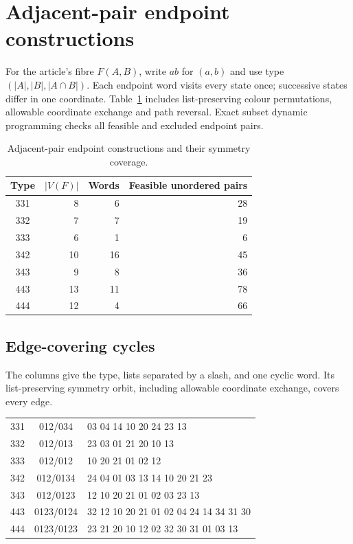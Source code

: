 \section{Adjacent-pair endpoint constructions}
\label{app:pair-five-constructions}
For the article's fibre $F(A,B)$, write $ab$ for $(a,b)$ and use type
$(|A|,|B|,|A\cap B|)$. Each endpoint word visits every state once;
successive states differ in one coordinate. Table~\ref{tab:pair-five-counts}
includes list-preserving colour permutations, allowable coordinate
exchange and path reversal. Exact subset dynamic programming checks
all feasible and excluded endpoint pairs.

\begin{table}[htbp]
\centering
\caption{Adjacent-pair endpoint constructions and their symmetry coverage.}
\label{tab:pair-five-counts}
\begin{tabular}{crrr}
\toprule
Type & $|V(F)|$ & Words & Feasible unordered pairs\\
\midrule
 331&8&6&28\\
 332&7&7&19\\
 333&6&1&6\\
 342&10&16&45\\
 343&9&8&36\\
 443&13&11&78\\
 444&12&4&66\\
\bottomrule
\end{tabular}
\end{table}


\subsection{Edge-covering cycles}
The columns give the type, lists separated by a slash, and one cyclic
word. Its list-preserving symmetry orbit, including allowable coordinate
exchange, covers every edge.
\begin{center}\small\ttfamily
\begin{tabular}{ccl}
331 & 012/034 & 03 04 14 10 20 24 23 13\\
332 & 012/013 & 23 03 01 21 20 10 13\\
333 & 012/012 & 10 20 21 01 02 12\\
342 & 012/0134 & 24 04 01 03 13 14 10 20 21 23\\
343 & 012/0123 & 12 10 20 21 01 02 03 23 13\\
443 & 0123/0124 & 32 12 10 20 21 01 02 04 24 14 34 31 30\\
444 & 0123/0123 & 23 21 20 10 12 02 32 30 31 01 03 13
\end{tabular}
\end{center}


